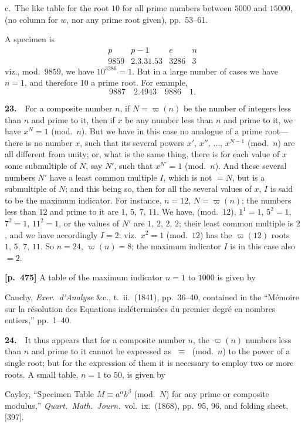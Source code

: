 \documentclass[11pt,a4paper]{article}
\providecommand{\totient}{\varpi}
\begin{document}
c.\ The like table for the root $10$ for all prime numbers between $5000$ and $15000$, (no column for $w$, nor any prime root given), pp.~53--61.

A specimen is
\[
\begin{array}{c|c|cc}
p & p-1 & e & n \\\hline
9859 & 2.3.31.53 & 3286 & 3
\end{array}
\]
viz., mod.\ $9859$, we have $10^{3286}=1$.   But in a large number of cases we have $n=1$, and therefore $10$ a prime root.   For example,
\[
9887\quad 2.4943\quad 9886\quad 1.
\]

\textbf{23.}\ \ For a composite number $n$, if $N=\totient(n)$ be the number of integers less than $n$ and prime to it, then if $x$ be any number less than $n$ and prime to it, we have $x^N=1$ (mod.\ $n$).   But we have in this case no analogue of a prime root---there is no number $x$, such that its several powers $x',\,x'',\,\ldots,\,x^{N-1}$ (mod.\ $n$) are all different from unity; or, what is the same thing, there is for each value of $x$ some submultiple of $N$, say $N'$, such that $x^{N'}=1$ (mod.\ $n$).   And these several numbers $N'$ have a least common multiple $I$, which is not $=N$, but is a submultiple of $N$; and this being so, then for all the several values of $x$, $I$ is said to be the maximum indicator.   For instance, $n=12$, $N=\totient(n)$; the numbers less than $12$ and prime to it are $1,\,5,\,7,\,11$.   We have, (mod.\ $12$), $1^1=1$, $5^2=1$, $7^2=1$, $11^2=1$, or the values of $N'$ are $1,\,2,\,2,\,2$; their least common multiple is $2$, and we have accordingly $I=2$: viz.\ $x^2=1$ (mod.\ $12$) has the $\totient(12)$ roots $1,\,5,\,7,\,11$.   So $n=24$, $\totient(n)=8$; the maximum indicator $I$ is in this case also $=2$.

\bigskip
\noindent\textbf{[p.~475]}\quad
A table of the maximum indicator $n=1$ to $1000$ is given by

Cauchy, \textit{Exer.\ d'Analyse} \&c., t.~ii.\ (1841), pp.~36--40, contained in the ``M\'emoire sur la r\'esolution des Equations ind\'etermin\'ees du premier degr\'e en nombres entiers,'' pp.~1--40.

\textbf{24.}\ \ It thus appears that for a composite number $n$, the $\totient(n)$ numbers less than $n$ and prime to it cannot be expressed as $\;\equiv\;$ (mod.\ $n$) to the power of a single root; but for the expression of them it is necessary to employ two or more roots.   A small table, $n=1$ to $50$, is given by

Cayley, ``Specimen Table $M\equiv a^\alpha b^\beta$ (mod.\ $N$) for any prime or composite modulus,'' \textit{Quart.\ Math.\ Journ.}\ vol.~ix.\ (1868), pp.~95, 96, and folding sheet, [397].
\end{document}
